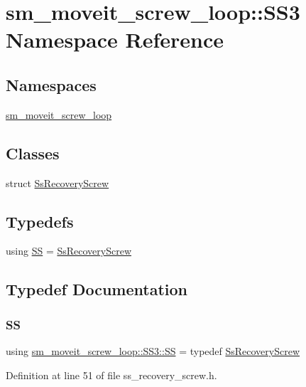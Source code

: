 \hypertarget{namespacesm__moveit__screw__loop_1_1SS3}{}\section{sm\+\_\+moveit\+\_\+screw\+\_\+loop\+:\+:S\+S3 Namespace Reference}
\label{namespacesm__moveit__screw__loop_1_1SS3}
\subsection*{Namespaces}
\begin{DoxyCompactItemize}
\item 
 \hyperlink{namespacesm__moveit__screw__loop_1_1SS3_1_1sm__moveit__screw__loop}{sm\+\_\+moveit\+\_\+screw\+\_\+loop}
\end{DoxyCompactItemize}
\subsection*{Classes}
\begin{DoxyCompactItemize}
\item 
struct \hyperlink{structsm__moveit__screw__loop_1_1SS3_1_1SsRecoveryScrew}{Ss\+Recovery\+Screw}
\end{DoxyCompactItemize}
\subsection*{Typedefs}
\begin{DoxyCompactItemize}
\item 
using \hyperlink{namespacesm__moveit__screw__loop_1_1SS3_a4334ca9a010e74d1c3c98199e2ab6b27}{SS} = \hyperlink{structsm__moveit__screw__loop_1_1SS3_1_1SsRecoveryScrew}{Ss\+Recovery\+Screw}
\end{DoxyCompactItemize}


\subsection{Typedef Documentation}
\mbox{\label{namespacesm__moveit__screw__loop_1_1SS3_a4334ca9a010e74d1c3c98199e2ab6b27}} 
\subsubsection{\texorpdfstring{SS}{SS}}
{\footnotesize\ttfamily using \hyperlink{namespacesm__moveit__screw__loop_1_1SS3_a4334ca9a010e74d1c3c98199e2ab6b27}{sm\+\_\+moveit\+\_\+screw\+\_\+loop\+::\+S\+S3\+::\+SS} = typedef \hyperlink{structsm__moveit__screw__loop_1_1SS3_1_1SsRecoveryScrew}{Ss\+Recovery\+Screw}}



Definition at line 51 of file ss\+\_\+recovery\+\_\+screw.\+h.

